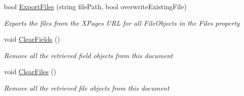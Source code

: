 \begin{DoxyCompactItemize}
bool \mbox{\hyperlink{class_document_object_a8753abc5a871bf84fc910e6a99936b2b}{Export\+Files}} (string file\+Path, bool overwrite\+Existing\+File)
\begin{DoxyCompactList}\small\item\em Exports the files from the X\+Pages U\+RL for all File\+Objects in the Files property \end{DoxyCompactList}\item 
void \mbox{\hyperlink{class_document_object_a28ab6562c34b5cf44ce7ab738d1730e1}{Clear\+Fields}} ()
\begin{DoxyCompactList}\small\item\em Remove all the retrieved field objects from this document \end{DoxyCompactList}\item 
void \mbox{\hyperlink{class_document_object_a4caebae7aec2a9375112739d2cf29f29}{Clear\+Files}} ()
\begin{DoxyCompactList}\small\item\em Remove all the retrieved file objects from this document \end{DoxyCompactList}\end{DoxyCompactItemize}
